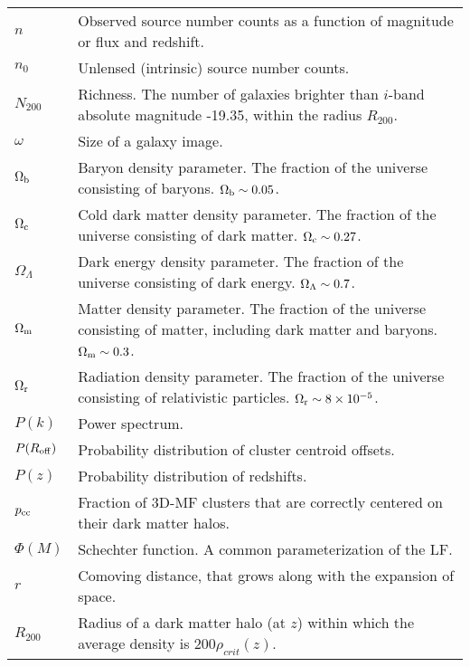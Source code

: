 \begin{tabular}{p{0.6in}p{5.8in}}
$n$ & Observed source number counts as a function of magnitude or flux and redshift. \\
$n_0$ & Unlensed (intrinsic) source number counts. \\
$N_{200}$ & Richness. The number of galaxies brighter than $i$-band absolute magnitude -19.35, within the radius $R_{200}$. \\
$\omega$ & Size of a galaxy image. \\
$\Omega_{\rm b}$ & Baryon density parameter. The fraction of the universe consisting of baryons. $\Omega_{\rm b} \sim 0.05$. \\
$\Omega_{\rm c}$ & Cold dark matter density parameter. The fraction of the universe consisting of dark matter. $\Omega_{\rm c} \sim 0.27$. \\
$\Omega_{\Lambda}$ & Dark energy density parameter. The fraction of the universe consisting of dark energy. $\Omega_{\rm \Lambda} \sim 0.7$. \\
$\Omega_{\rm m}$ & Matter density parameter. The fraction of the universe consisting of matter, including dark matter and baryons. $\Omega_{\rm m} \sim 0.3$. \\
$\Omega_{\rm r}$ & Radiation density parameter. The fraction of the universe consisting of relativistic particles. $\Omega_{\rm r} \sim 8 \times 10^{-5}$. \\
$P(k)$ & Power spectrum. \\
$P(R_{\rm off})$ & Probability distribution of cluster centroid offsets. \\
$P(z)$ & Probability distribution of redshifts. \\
$p_{\rm cc}$ & Fraction of \acs{3D-MF} clusters that are correctly centered on their dark matter halos. \\
$\Phi(M)$ & Schechter function. A common parameterization of the \acs{LF}. \\
$r$ & Comoving distance, that grows along with the expansion of space. \\
$R_{200}$ & Radius of a dark matter halo (at $z$) within which the average density is 200$\rho_{crit}(z)$. \\

\end{tabular}
